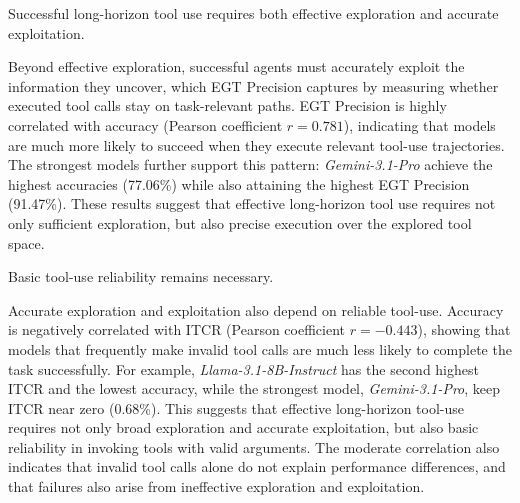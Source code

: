 \documentclass{llmxive}
\begin{document}



\begin{takeaway}
Successful long-horizon tool use requires both effective exploration and accurate exploitation.
\end{takeaway}

\noindent Beyond effective exploration, successful agents must accurately exploit the information they uncover, which EGT Precision captures by measuring whether executed tool calls stay on task-relevant paths. 
EGT Precision is highly correlated with accuracy (Pearson coefficient $r=0.781$), indicating that models are much more likely to succeed when they execute relevant tool-use trajectories.
The strongest models further support this pattern: \textit{Gemini-3.1-Pro} achieve the highest accuracies (77.06\%) while also attaining the highest EGT Precision (91.47\%). 
These results suggest that effective long-horizon tool use requires not only sufficient exploration, but also precise execution over the explored tool space.

\begin{takeaway}
Basic tool-use reliability remains necessary.
\end{takeaway}

\noindent Accurate exploration and exploitation also depend on reliable tool-use. 
Accuracy is negatively correlated with ITCR (Pearson coefficient $r=-0.443$), showing that models that frequently make invalid tool calls are much less likely to complete the task successfully. 
For example, \textit{Llama-3.1-8B-Instruct} has the second highest ITCR and the lowest accuracy, while the strongest model, \textit{Gemini-3.1-Pro}, keep ITCR near zero (0.68\%). 
This suggests that effective long-horizon tool-use requires not only broad exploration and accurate exploitation, but also basic reliability in invoking tools with valid arguments.
The moderate correlation also indicates that invalid tool calls alone do not explain performance differences, and that failures also arise from ineffective exploration and exploitation.
\end{document}
